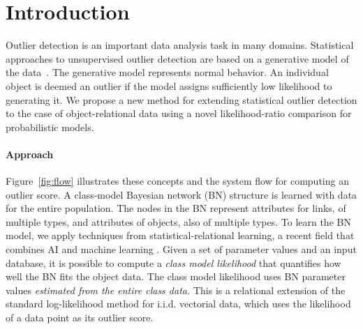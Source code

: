 \section{Introduction} 
Outlier detection is an important data analysis task in many domains. Statistical approaches to unsupervised outlier detection are based on a generative model of the data~\cite{aggarwal2013}. The generative model represents normal behavior. An individual object is deemed an outlier if  the model assigns sufficiently low likelihood to generating it. 
We propose a new method for extending statistical  outlier detection to the case of object-relational data using a novel likelihood-ratio comparison for probabilistic models. 

\paragraph{Approach} 
Figure~\ref{fig:flow} illustrates these concepts and the system flow for computing an outlier score. A class-model Bayesian network (BN) structure is learned with data for the entire population. The nodes in the BN represent attributes for links, of multiple types, and attributes of objects, also of multiple types. To learn the BN model, we apply techniques from statistical-relational learning, a  recent field that combines AI and machine learning \cite{SRL2007,Schulte2012,Domingos2009}. 
Given a set of parameter values and an input database, it is possible to compute a {\em class model likelihood} that quantifies how well the BN fits the object data. The class model likelihood uses BN parameter values {\em estimated from the entire class data.} This  is a relational extension of the standard log-likelihood method for i.i.d. vectorial data, which uses the likelihood of a data point as its outlier score. %

